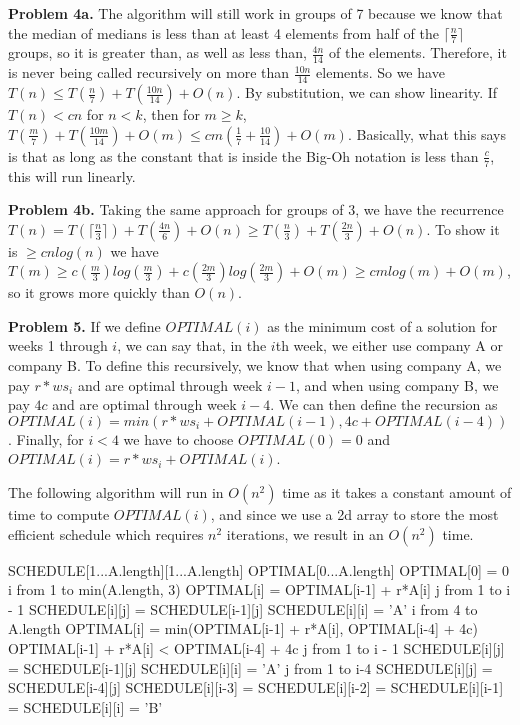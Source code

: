 \documentclass{article}
\begin{document}
\hfill

\textbf{Problem 4a.} The algorithm will still work in groups of 7 because we know that the median of medians is less than at least 4 elements from half of the $\lceil \frac{n}{7} \rceil$ groups, so it is greater than, as well as less than, $\frac{4n}{14}$ of the elements. Therefore, it is never being called recursively on more than $\frac{10n}{14}$ elements. So we have $T(n) \leq T(\frac{n}{7}) + T(\frac{10n}{14}) + O(n)$. By substitution, we can show linearity. If $T(n) < cn$ for $n < k$, then for $m \geq k$, $T(\frac{m}{7}) + T(\frac{10m}{14}) + O(m) \leq cm(\frac{1}{7} + \frac{10}{14}) + O(m)$. Basically, what this says is that as long as the constant that is inside the Big-Oh notation is less than $\frac{c}{7}$, this will run linearly. 

\hfill

\textbf{Problem 4b.} Taking the same approach for groups of 3, we have the recurrence $T(n) = T(\lceil \frac{n}{3} \rceil) + T(\frac{4n}{6}) + O(n) \geq T(\frac{n}{3}) + T(\frac{2n}{3}) + O(n)$. To show it is $\geq cnlog(n)$ we have $T(m) \geq c(\frac{m}{3})log(\frac{m}{3}) + c(\frac{2m}{3})log(\frac{2m}{3}) + O(m) \geq cmlog(m) + O(m)$, so it grows more quickly than $O(n)$.

\hfill

\textbf{Problem 5.} If we define $OPTIMAL(i)$ \cite{website:4} \cite{website:5} as the minimum cost of a solution for weeks 1 through $i$, we can say that, in the $i$th week, we either use company A or company B. To define this recursively, we know that when using company A, we pay $r*ws_i$ and are optimal through week $i-1$, and when using company B, we pay $4c$ and are optimal through week $i-4$. We can then define the recursion as $OPTIMAL(i) = min(r*ws_i + OPTIMAL(i - 1), 4c + OPTIMAL(i - 4))$. Finally, for $i < 4$ we have to choose $OPTIMAL(0) = 0$ and $OPTIMAL(i) = r*ws_i + OPTIMAL(i)$.

\hfill

The following algorithm will run in $O(n^2)$ time as it takes a constant amount of time to compute $OPTIMAL(i)$, and since we use a 2d array to store the most efficient schedule which requires $n^2$ iterations, we result in an $O(n^2)$ time. 

\begin{codebox}
    \li SCHEDULE[1...A.length][1...A.length]
    \li OPTIMAL[0...A.length]
    \li
    \li OPTIMAL[0] = 0
    \li \For i from 1 to min(A.length, 3) \Do
    \li OPTIMAL[i] = OPTIMAL[i-1] + r*A[i]
    \li
    \li \For j from 1 to i - 1 \Do
    \li SCHEDULE[i][j] = SCHEDULE[i-1][j] \End
    \li SCHEDULE[i][i] = 'A' \End
    \li
    \li \For i from 4 to A.length \Do
    \li OPTIMAL[i] = min(OPTIMAL[i-1] + r*A[i], OPTIMAL[i-4] + 4c)
    \li
    \li \If OPTIMAL[i-1] + r*A[i] < OPTIMAL[i-4] + 4c \Then
    \li \For j from 1 to i - 1 \Do
    \li SCHEDULE[i][j] = SCHEDULE[i-1][j] \End
    \li
    \li SCHEDULE[i][i] = 'A' 
    \li \Else
    \li \For j from 1 to i-4 \Do
    \li SCHEDULE[i][j] = SCHEDULE[i-4][j] \End
    \li
    \li SCHEDULE[i][i-3] = SCHEDULE[i][i-2] = SCHEDULE[i][i-1] = SCHEDULE[i][i] = 'B' \End
\end{codebox}
\end{document}
